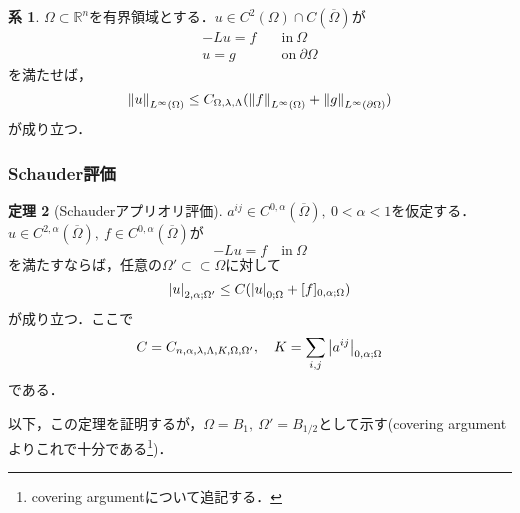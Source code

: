 \documentclass[a4paper]{ltjsarticle}
\newcommand{\Rset}{\mathbb{R}}
\newcommand{\Om}{\Omega}
\newcommand{\pOm}{\partial\Omega}
\newcommand{\Ombar}{\overline{\Omega}}
\newcommand{\ssubset}{\subset\subset}
\newcommand{\inn}{\quad\text{in}\ }
\newcommand{\on}{\quad \text{on}\ }
\newcommand{\1}{\mathbbm{1}}
\numberwithin{equation}{section}
\theoremstyle{definition}
\newtheorem{thm}{定理}[section]
\newtheorem{cor}[thm]{系}
\begin{document}
\begin{cor}
    $\Om\subset \Rset^n$を有界領域とする．$u\in C^2(\Om)\cap C(\Ombar)$が
    \begin{align}
        -Lu=f & \inn\Om \\
        u=g &\on \pOm   
    \end{align}
    を満たせば，
    \begin{equation}
        \norm{u}_{L^\infty(\Om)}\leq C_{\Om,\lambda,\Lambda}(\norm{f}_{L^\infty(\Om)}+\norm{g}_{L^\infty(\pOm)})
    \end{equation}
    が成り立つ．
\end{cor}
\subsubsection{Schauder評価}
\begin{thm}[Schauderアプリオリ評価]\label{thm:schauder_non_divergence}
    $a^{ij}\in C^{0,\alpha}(\Ombar),\ 0<\alpha<1$を仮定する．$u\in C^{2,\alpha}(\Ombar),\ f\in C^{0,\alpha}(\Ombar)$が
    \begin{equation}
        -Lu=f\inn \Om 
    \end{equation}
    を満たすならば，任意の$\Om'\ssubset \Om$に対して
    \begin{equation}
        \abs{u}_{2,\alpha;\Om'}\leq C(\abs{u}_{0;\Om}+[f]_{0,\alpha;\Om})
    \end{equation}
    が成り立つ．ここで
    \begin{equation}
        C=C_{n,\alpha,\lambda,\Lambda,K,\Om,\Om'},\quad K=\sum_{i,j}\abs{a^{ij}}_{0,\alpha;\Om}
    \end{equation}
    である．
\end{thm}
以下，この定理を証明するが，$\Om=B_1,\ \Om'=B_{1/2}$として示す(covering argumentよりこれで十分である\footnote{covering argumentについて追記する．})．
\end{document}
